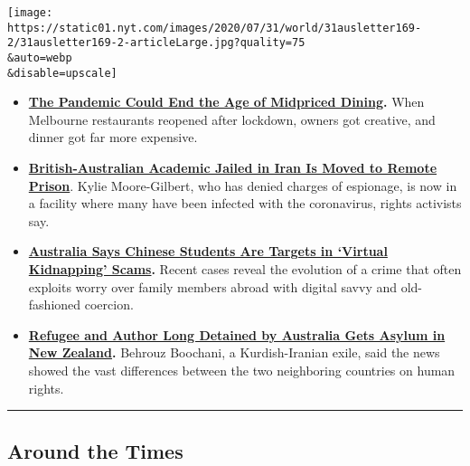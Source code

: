 \texttt{[image: https://static01.nyt.com/images/2020/07/31/world/31ausletter169-2/31ausletter169-2-articleLarge.jpg?quality=75\\\&auto=webp\\\&disable=upscale]}

\begin{itemize}
\tightlist
\item
  \textbf{\href{https://www.nytimes.com/2020/07/28/dining/melbourne-restaurants-coronavirus.html}{The
  Pandemic Could End the Age of Midpriced Dining}.} When Melbourne
  restaurants reopened after lockdown, owners got creative, and dinner
  got far more expensive.
\end{itemize}

\begin{itemize}
\tightlist
\item
  \textbf{\href{https://www.nytimes.com/2020/07/28/world/europe/british-australian-academic-jail-iran-qarchak.html}{British-Australian
  Academic Jailed in Iran Is Moved to Remote Prison}}. Kylie
  Moore-Gilbert, who has denied charges of espionage, is now in a
  facility where many have been infected with the coronavirus, rights
  activists say.
\end{itemize}

\begin{itemize}
\item
  \textbf{\href{https://www.nytimes.com/2020/07/28/world/australia/chinese-students-virtual-kidnapping.html}{Australia
  Says Chinese Students Are Targets in `Virtual Kidnapping' Scams}.}
  Recent cases reveal the evolution of a crime that often exploits worry
  over family members abroad with digital savvy and old-fashioned
  coercion.
\item
  \textbf{\href{https://www.nytimes.com/2020/07/24/world/australia/behrouz-boochani-asylum-new-zealand.html}{Refugee
  and Author Long Detained by Australia Gets Asylum in New Zealand}.}
  Behrouz Boochani, a Kurdish-Iranian exile, said the news showed the
  vast differences between the two neighboring countries on human
  rights.
\end{itemize}

\begin{center}\rule{0.5\linewidth}{\linethickness}\end{center}

\hypertarget{around-the-times}{%
\subsection{Around the Times}\label{around-the-times}}

